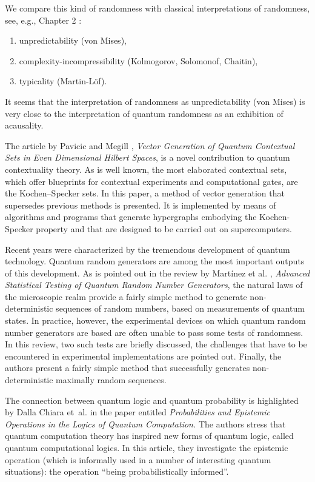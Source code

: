 \documentclass[entropy,editorial,accept,moreauthors,pdftex,10pt,a4paper]{Definitions/mdpi}
\begin{document}
We compare this kind of randomness with classical interpretations of randomness, see, e.g.,
Chapter 2 \cite{AKHP1}:
\begin{enumerate}[leftmargin=6mm,labelsep=3mm]
\item unpredictability (von Mises),
\item  complexity-incompressibility (Kolmogorov, Solomonof, Chaitin),
\item typicality (Martin-L\"of).
\end{enumerate}

It seems that the interpretation of  randomness as unpredictability (von Mises) is very close to the interpretation of
 quantum randomness as an exhibition of acausality.


The article by Pavicic and Megill \cite{A1},  {\it Vector Generation of Quantum Contextual Sets in Even Dimensional Hilbert Spaces},
is a novel contribution to quantum contextuality theory.  As is well known, the most elaborated contextual sets,
which offer blueprints for contextual experiments and computational gates, are the Kochen--Specker sets.
In this paper,  a method of vector generation that supersedes previous methods is presented.  It is implemented by means of algorithms and programs that generate hypergraphs embodying
the Kochen-Specker property and that are designed to be carried out on supercomputers.

Recent years were characterized by the tremendous development of quantum technology. Quantum random generators are among the most important
outputs of this development.   As is pointed out in the review by Mart\'inez et al. \cite{A2},
{\it  Advanced Statistical Testing of Quantum Random Number Generators},
the natural laws of the microscopic realm provide a fairly simple method to
generate non-deterministic sequences of random numbers, based on measurements of quantum states.  In practice, however, the experimental devices
on which quantum random number generators are based are often unable to pass some tests of randomness. In this review, two such tests are briefly discussed,  the challenges that
have to be encountered in experimental implementations are pointed out. Finally, the authors
 present a fairly simple method that successfully generates non-deterministic maximally random sequences.

The connection between quantum logic and quantum probability is highlighted by Dalla Chiara et~al. \cite{A3} in
the paper entitled {\it Probabilities and Epistemic Operations in the Logics of Quantum Computation.} The authors
stress that quantum computation theory has inspired new forms of quantum logic, called quantum computational logics. In this article, they investigate the
epistemic operation (which is informally used in a number of interesting quantum situations): the operation ``being probabilistically informed''.
\end{document}
